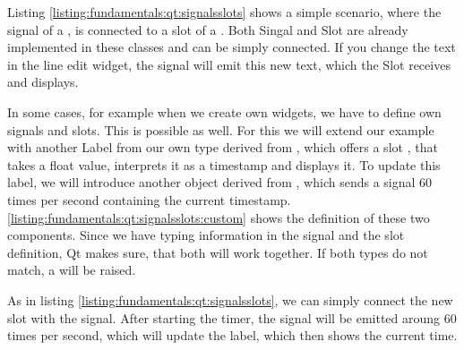 Listing \ref{listing:fundamentals:qt:signalsslots} shows a simple scenario,
where the signal of a , is connected to
a slot of a . Both Singal and Slot are
already implemented in these classes and can be simply connected. If you change
the text in the line edit widget, the signal 
will emit this new text, which the Slot  receives
and displays.



In some cases, for example when we create own widgets, we have to define own
signals and slots. This is possible as well. For this we will extend our example
with another Label from our own type  derived
from , which offers a slot
, that takes a float value, interprets it as a
timestamp and displays it. To update this label, we will introduce another
object  derived from
, which sends a signal 60 times per second
containing the current timestamp.
\ref{listing:fundamentals:qt:signalsslots:custom} shows the definition of these
two components. Since we have typing information in the signal and the slot
definition, Qt makes sure, that both will work together. If both types do not
match, a  will be raised.



As in listing \ref{listing:fundamentals:qt:signalsslots}, we can simply connect
the new slot with the signal. After starting the timer, the signal will be
emitted aroung 60 times per second, which will update the label, which then
shows the current time.



